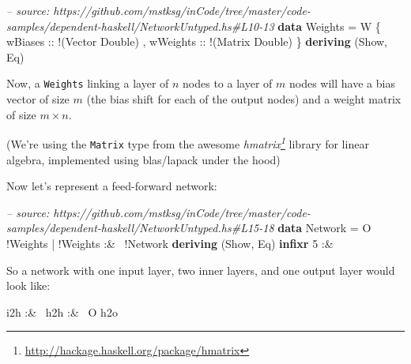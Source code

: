 \documentclass[]{article}
\newenvironment{Shaded}{}{}
\newcommand{\KeywordTok}[1]{\textcolor[rgb]{0.00,0.44,0.13}{\textbf{{#1}}}}
\newcommand{\DataTypeTok}[1]{\textcolor[rgb]{0.56,0.13,0.00}{{#1}}}
\newcommand{\DecValTok}[1]{\textcolor[rgb]{0.25,0.63,0.44}{{#1}}}
\newcommand{\CommentTok}[1]{\textcolor[rgb]{0.38,0.63,0.69}{\textit{{#1}}}}
\newcommand{\OtherTok}[1]{\textcolor[rgb]{0.00,0.44,0.13}{{#1}}}
\newcommand{\FunctionTok}[1]{\textcolor[rgb]{0.02,0.16,0.49}{{#1}}}
\newcommand{\NormalTok}[1]{{#1}}
\renewcommand{\href}[2]{#2\footnote{\url{#1}}}
\begin{document}
\begin{Shaded}
\begin{Highlighting}[]
\CommentTok{-- source: https://github.com/mstksg/inCode/tree/master/code-samples/dependent-haskell/NetworkUntyped.hs#L10-13}
\KeywordTok{data} \DataTypeTok{Weights} \FunctionTok{=} \DataTypeTok{W} \NormalTok{\{}\OtherTok{ wBiases  ::} \FunctionTok{!}\NormalTok{(}\DataTypeTok{Vector} \DataTypeTok{Double}\NormalTok{)}
                 \NormalTok{,}\OtherTok{ wWeights ::} \FunctionTok{!}\NormalTok{(}\DataTypeTok{Matrix} \DataTypeTok{Double}\NormalTok{)}
                 \NormalTok{\}}
  \KeywordTok{deriving} \NormalTok{(}\DataTypeTok{Show}\NormalTok{, }\DataTypeTok{Eq}\NormalTok{)}
\end{Highlighting}
\end{Shaded}

Now, a \texttt{Weights} linking a layer of \(n\) nodes to a layer of
\(m\) nodes will have a bias vector of size \(m\) (the bias shift for
each of the output nodes) and a weight matrix of size \(m \times n\).

(We're using the \texttt{Matrix} type from the awesome
\emph{\href{http://hackage.haskell.org/package/hmatrix}{hmatrix}}
library for linear algebra, implemented using blas/lapack under the
hood)

Now let's represent a feed-forward network:

\begin{Shaded}
\begin{Highlighting}[]
\CommentTok{-- source: https://github.com/mstksg/inCode/tree/master/code-samples/dependent-haskell/NetworkUntyped.hs#L15-18}
\KeywordTok{data} \DataTypeTok{Network} \FunctionTok{=} \DataTypeTok{O} \FunctionTok{!}\DataTypeTok{Weights}
             \FunctionTok{|} \FunctionTok{!}\DataTypeTok{Weights} \FunctionTok{:&~} \FunctionTok{!}\DataTypeTok{Network}
  \KeywordTok{deriving} \NormalTok{(}\DataTypeTok{Show}\NormalTok{, }\DataTypeTok{Eq}\NormalTok{)}
\KeywordTok{infixr} \DecValTok{5} \FunctionTok{:&~}
\end{Highlighting}
\end{Shaded}

So a network with one input layer, two inner layers, and one output
layer would look like:

\begin{Shaded}
\begin{Highlighting}[]
\NormalTok{i2h }\FunctionTok{:&~} \NormalTok{h2h }\FunctionTok{:&~} \DataTypeTok{O} \NormalTok{h2o}
\end{Highlighting}
\end{Shaded}
\end{document}
